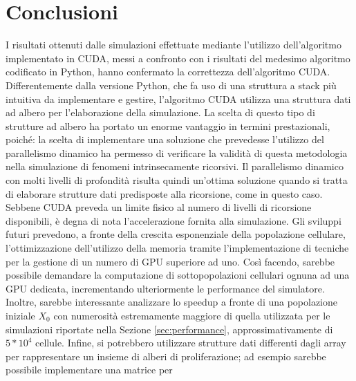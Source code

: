 
\chapter{Conclusioni} %

\label{Conclusioni} %



I risultati ottenuti dalle simulazioni effettuate mediante
l'utilizzo dell'algoritmo implementato in CUDA, messi a confronto con i
risultati del medesimo algoritmo codificato in Python, hanno confermato
la correttezza dell'algoritmo CUDA. Differentemente dalla versione Python, che fa uso di una
struttura a stack più intuitiva da implementare e gestire,
l'algoritmo CUDA utilizza una struttura dati ad albero
per l'elaborazione della simulazione. La scelta di questo tipo di strutture 
ad albero ha portato un enorme
vantaggio in termini prestazionali, poiché: la scelta di implementare
una soluzione che prevedesse l'utilizzo del parallelismo dinamico ha permesso di
verificare la validità di questa metodologia nella simulazione di fenomeni
intrinsecamente ricorsivi. Il parallelismo dinamico con molti livelli
di profondità risulta quindi un'ottima soluzione quando si tratta di elaborare
strutture dati predisposte alla ricorsione, come in questo caso. Sebbene CUDA
preveda un limite fisico al numero di livelli di ricorsione disponibili, è
degna di nota l'accelerazione fornita alla simulazione.
Gli sviluppi futuri prevedono, a fronte della crescita esponenziale della 
popolazione cellulare, l'ottimizzazione dell'utilizzo della memoria 
tramite l'implementazione di tecniche per la gestione di un numero 
di GPU superiore ad uno. Così facendo, sarebbe possibile demandare la computazione 
di sottopopolazioni cellulari ognuna ad una GPU dedicata, incrementando 
ulteriormente le performance del simulatore. Inoltre, sarebbe interessante 
analizzare lo speedup a fronte di una popolazione iniziale $X_{0}$ con 
numerosità estremamente maggiore di quella utilizzata per le simulazioni 
riportate nella Sezione \ref{sec:performance}, approssimativamente di $5*10^4$
cellule. Infine, si potrebbero utilizzare strutture dati
differenti dagli array per rappresentare un insieme di alberi di 
proliferazione; ad esempio sarebbe possibile implementare una matrice per 
